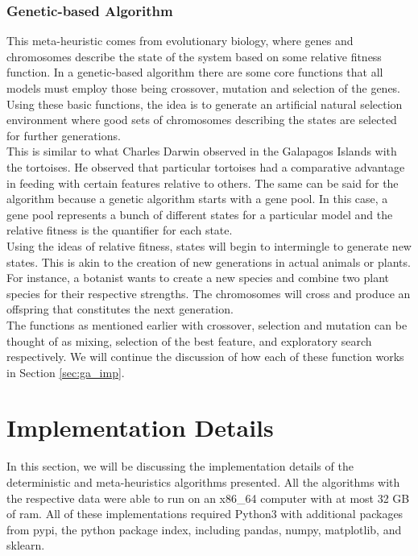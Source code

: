 \documentclass[a4paper,12pt]{article}
\numberwithin{equation}{section}
\begin{document}
\subsubsection{Genetic-based Algorithm}
This meta-heuristic comes from evolutionary biology, where genes and chromosomes describe the state of the system based on some relative fitness function. In a genetic-based algorithm there are some core functions that all models must employ those being crossover, mutation and selection of the genes. Using these basic functions, the idea is to generate an artificial natural selection environment where good sets of chromosomes describing the states are selected for further generations. \\

This is similar to what Charles Darwin observed in the Galapagos Islands with the tortoises. He observed that particular tortoises had a comparative advantage in feeding with certain features relative to others. The same can be said for the algorithm because a genetic algorithm starts with a gene pool. In this case, a gene pool represents a bunch of different states for a particular model and the relative fitness is the quantifier for each state. \\

Using the ideas of relative fitness, states will begin to intermingle to generate new states. This is akin to the creation of new generations in actual animals or plants. For instance, a botanist wants to create a new species and combine two plant species for their respective strengths. The chromosomes will cross and produce an offspring that constitutes the next generation.\\

The functions as mentioned earlier with crossover, selection and mutation can be thought of as mixing, selection of the best feature, and exploratory search respectively.  We will continue the discussion of how each of these function works in Section \ref{sec:ga_imp}.

\section{Implementation Details} \label{sec:implementation}
In this section, we will be discussing the implementation details of the deterministic and meta-heuristics algorithms presented. All the algorithms with the respective data were able to run on an x86\_64 computer with at most 32 GB of ram. All of these implementations required Python3 with additional packages from pypi, the python package index, including pandas, numpy, matplotlib, and sklearn.\\
\end{document}
